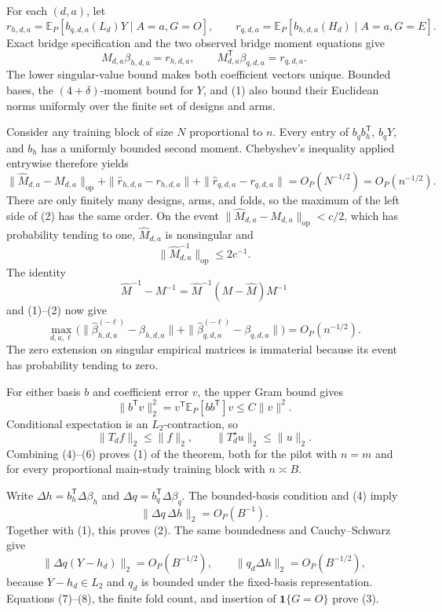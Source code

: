 For each \((d,a)\), let
\[
 r_{h,d,a}=\mathbb E_P[b_{q,d,a}(L_d)Y\mid A=a,G=O],
 \qquad
 r_{q,d,a}=\mathbb E_P[b_{h,d,a}(H_d)\mid A=a,G=E].
\]
Exact bridge specification and the two observed bridge moment equations give
\[
 M_{d,a}\beta_{h,d,a}=r_{h,d,a},
 \qquad
 M_{d,a}^{\mathsf T}\beta_{q,d,a}=r_{q,d,a}.                 \tag{1}
\]
The lower singular-value bound makes both coefficient vectors unique.  Bounded bases, the \((4+\delta)\)-moment bound for \(Y\), and (1) also bound their Euclidean norms uniformly over the finite set of designs and arms.

Consider any training block of size \(N\) proportional to \(n\).  Every entry of \(b_qb_h^{\mathsf T}\), \(b_qY\), and \(b_h\) has a uniformly bounded second moment.  Chebyshev's inequality applied entrywise therefore yields
\[
 \|\widehat M_{d,a}-M_{d,a}\|_{\mathrm{op}}
 +\|\widehat r_{h,d,a}-r_{h,d,a}\|
 +\|\widehat r_{q,d,a}-r_{q,d,a}\|
 =O_P(N^{-1/2})=O_P(n^{-1/2}).                               \tag{2}
\]
There are only finitely many designs, arms, and folds, so the maximum of the left side of (2) has the same order.  On the event
\(\|\widehat M_{d,a}-M_{d,a}\|_{\mathrm{op}}<c/2\), which has probability tending to one, \(\widehat M_{d,a}\) is nonsingular and
\[
 \|\widehat M_{d,a}^{-1}\|_{\mathrm{op}}\le 2c^{-1}.
\]
The identity
\[
 \widehat M^{-1}-M^{-1}
 =\widehat M^{-1}(M-\widehat M)M^{-1}                       \tag{3}
\]
and (1)--(2) now give
\[
 \max_{d,a,\ell}\bigl(
 \|\widehat\beta_{h,d,a}^{(-\ell)}-\beta_{h,d,a}\|
 +\|\widehat\beta_{q,d,a}^{(-\ell)}-\beta_{q,d,a}\|
 \bigr)=O_P(n^{-1/2}).                                      \tag{4}
\]
The zero extension on singular empirical matrices is immaterial because its event has probability tending to zero.

For either basis \(b\) and coefficient error \(v\), the upper Gram bound gives
\[
 \|b^{\mathsf T}v\|_2^2
 =v^{\mathsf T}\mathbb E_P[bb^{\mathsf T}]v
 \le C\|v\|^2.                                             \tag{5}
\]
Conditional expectation is an \(L_2\)-contraction, so
\[
 \|T_df\|_2\le\|f\|_2,
 \qquad \|T_d^\star u\|_2\le\|u\|_2.                    \tag{6}
\]
Combining (4)--(6) proves (1) of the theorem, both for the pilot with \(n=m\) and for every proportional main-study training block with \(n\asymp B\).

Write \(\Delta h=b_h^{\mathsf T}\Delta\beta_h\) and \(\Delta q=b_q^{\mathsf T}\Delta\beta_q\).  The bounded-basis condition and (4) imply
\[
 \|\Delta q\,\Delta h\|_2=O_P(B^{-1}).                    \tag{7}
\]
Together with (1), this proves (2).  The same boundedness and Cauchy--Schwarz give
\[
 \|\Delta q(Y-h_d)\|_2=O_P(B^{-1/2}),
 \qquad
 \|q_d\Delta h\|_2=O_P(B^{-1/2}),                          \tag{8}
\]
because \(Y-h_d\in L_2\) and \(q_d\) is bounded under the fixed-basis representation.  Equations (7)--(8), the finite fold count, and insertion of \(\mathbf1\{G=O\}\) prove (3).

